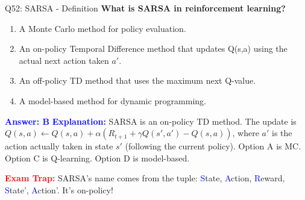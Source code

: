 \documentclass[8pt]{beamer}
\begin{document}
	\begin{frame}{Q52: SARSA - Definition}
		\fontsize{6.5}{7.5}\selectfont
		\textbf{What is SARSA in reinforcement learning?}
		
		\begin{enumerate}
			\item A Monte Carlo method for policy evaluation.
			\item An on-policy Temporal Difference method that updates Q(s,a) using the actual next action taken $a'$.
			\item An off-policy TD method that uses the maximum next Q-value.
			\item A model-based method for dynamic programming.
		\end{enumerate}
		
		\vspace{0.1cm}
		\textcolor{blue}{\textbf{Answer: B}}
		\vspace{0.1cm}
		\textcolor{blue}{\textbf{Explanation:}} SARSA is an on-policy TD method. The update is $Q(s,a) \leftarrow Q(s,a) + \alpha(R_{t+1} + \gamma Q(s',a') - Q(s,a))$, where $a'$ is the action actually taken in state $s'$ (following the current policy). Option A is MC. Option C is Q-learning. Option D is model-based.
		
		\textcolor{red}{\textbf{Exam Trap:}} SARSA's name comes from the tuple: \textcolor{blue}{S}tate, \textcolor{blue}{A}ction, \textcolor{blue}{R}eward, \textcolor{blue}{S}tate', \textcolor{blue}{A}ction'. It's on-policy!
	\end{frame}
	
\end{document}
